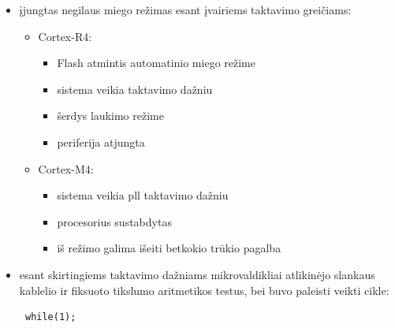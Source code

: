 \documentclass[a4paper, 12pt]{article} %
\begin{document}
\begin{onehalfspacing}
\begin{itemize}
\begin{itemize}
\item Cortex-M4:
\begin{itemize}
\item vidinis 1.2V \k{i}tampos reguliatorius i\v{s}jungtas
\item Pll\footnote{PLL - phase lock loop da\v{z}ni\k{u} generatorius}, vidinis 16MHz ir i\v{s}orinis 8MHz taktiniai osciliatoriai atjungti. Veikia vidinis 32kHz taktinis osciliatorius
\item procesorius sustabdytas
\item mikrovaldiklis minimalioje srov\.es suvartojimo b\=usenoje.
\item re\v{z}im\k{a} galima palikti:
\begin{itemize} 
\item gavus i\v{s}orin\k{i} impuls\k{a} \k{i} NRST arba WKUP i\v{s}vadus 
\item realaus laiko laikrod\v{z}iui $($RTC$)$ sugeneravus tr\=uk\k{i}
\end{itemize} 
\end{itemize}
\end{itemize}
\item \k{i}jungtas negilaus miego re\v{z}imas esant \k{i}vairiems taktavimo grei\v{c}iams:
\begin{itemize} %
\item Cortex-R4:
\begin{itemize}
\item Flash atmintis automatinio miego re\v{z}ime
\item sistema veikia taktavimo da\v{z}niu
\item \v{s}erdys laukimo re\v{z}ime
\item periferija atjungta
\end{itemize}
\item Cortex-M4:
\begin{itemize}
\item sistema veikia pll taktavimo da\v{z}niu
\item procesorius sustabdytas 
\item i\v{s} re\v{z}imo galima i\v{s}eiti betkokio tr\=ukio pagalba
\end{itemize}
\end{itemize}
\item esant skirtingiems taktavimo da\v{z}niams mikrovaldikliai atlikin\.ejo slankaus kablelio ir fiksuoto tikslumo aritmetikos testus, bei buvo paleisti veikti cikle: \begin{verbatim} while(1); \end{verbatim} 
\end{itemize}

\end{onehalfspacing}
\end{document}
